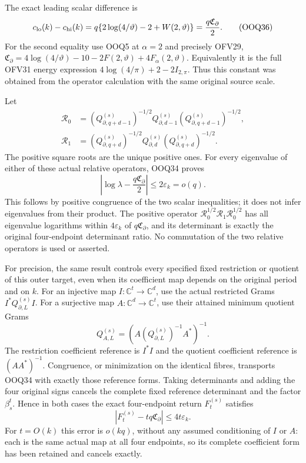 \documentclass[11pt,a4paper]{article}
\begin{document}
The exact leading scalar difference is
\[
c_{\rm lo}(k)-c_{\rm hi}(k)
 =q\{2\log(4/\vartheta)-2+W(2,\vartheta)\}
 =\frac{q\mathfrak C_\partial}{2}.
\tag{OOQ36}
\]
For the second equality use OOQ5 at $\alpha=2$ and precisely
OFV29,
$\mathfrak C_\partial=4\log(4/\vartheta)-10
-2F(2,\vartheta)+4F_\alpha(2,\vartheta)$.
Equivalently it is the full OFV31 energy expression
$4\log(4/\pi)+2-2I_{2,\pi}$.
Thus this constant was obtained from the operator calculation
with the same original source scale.

Let
\[
\begin{split}
\mathcal R_0&=(Q_{\partial,q+d-1}^{(s)})^{-1/2}
 Q_{\partial,d-1}^{(s)}
 (Q_{\partial,q+d-1}^{(s)})^{-1/2},\\
\mathcal R_1&=(Q_{\partial,q+d}^{(s)})^{-1/2}
 Q_{\partial,d}^{(s)}
 (Q_{\partial,q+d}^{(s)})^{-1/2}.
\end{split}\tag{OOQ37}
\]
The positive square roots are the unique positive ones.
For every eigenvalue of either of these actual relative
operators, OOQ34 proves
\[
\left|\log\lambda-\frac{q\mathfrak C_\partial}{2}\right|
\le2\varepsilon_k=o(q).
\tag{OOQ38}
\]
This follows by positive congruence of the two scalar
inequalities; it does not infer eigenvalues from their product.
The positive operator
$\mathcal R_0^{1/2}\mathcal R_1\mathcal R_0^{1/2}$ has
all eigenvalue logarithms within $4\varepsilon_k$ of
$q\mathfrak C_\partial$, and its determinant is exactly the
original four-endpoint determinant ratio. No commutation
of the two relative operators is used or asserted.

For precision, the same result controls every specified
fixed restriction or quotient of this outer target, even
when its coefficient map depends on the original period
and on $k$. For an injective map $I:\mathbb C^t\to\mathbb C^d$,
use the actual restricted Grams $I^*Q_{\partial,L}^{(s)}I$.
For a surjective map $A:\mathbb C^d\to\mathbb C^t$,
use their attained minimum quotient Grams
\[
Q_{A,L}^{(s)}
 =(A(Q_{\partial,L}^{(s)})^{-1}A^*)^{-1}.
\tag{OOQ39}
\]
The restriction coefficient reference is $I^*I$ and the
quotient coefficient reference is $(AA^*)^{-1}$.
Congruence, or minimization on the identical fibres,
transports OOQ34 with exactly those reference forms.
Taking determinants and adding the four original signs
cancels the complete fixed reference determinant and
the factor $\beta_s^t$. Hence in both cases the exact
four-endpoint return $F_t^{(s)}$ satisfies
\[
|F_t^{(s)}-tq\mathfrak C_\partial|
\le4t\varepsilon_k.
\tag{OOQ40}
\]
For $t=O(k)$ this error is $o(kq)$, without any assumed
conditioning of $I$ or $A$: each is the same actual map
at all four endpoints, so its complete coefficient form
has been retained and cancels exactly.
\end{document}
